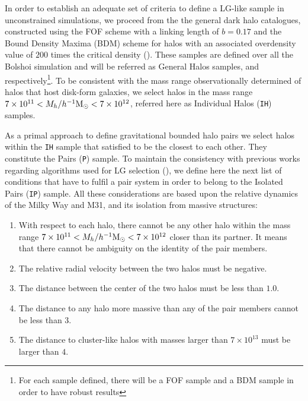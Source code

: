 \documentclass[a4,useAMS,usenatbib,usegraphicx]{latex/mn2e}
\begin{document}
In order to establish an adequate set of criteria to define a LG-like 
sample in unconstrained simulations, we proceed from the the general dark 
halo catalogues, constructed using the FOF scheme with a linking length of 
$b=0.17$ and the Bound Density Maxima (BDM) scheme for halos with an 
associated overdensity value of $200$ times the critical density 
(). These samples are defined over all the Bolshoi 
simulation and will be referred as General Halos samples, \GHFOF and 
\GHBDM respectively\footnote{For each sample defined, there will be a FOF 
sample and a BDM sample in order to have robust results}. To be consistent 
with the mass range observationally determined of halos that host disk-form 
galaxies, we select halos in the mass range $7\times10^{11} < M_{h}/\hMsun 
< 7\times 10^{12}$, referred here as Individual Halos (\texttt{IH}) samples. 



As a primal approach to define gravitational bounded halo pairs we select 
halos within the \texttt{IH} sample that satisfied to be the closest to 
each other. They constitute the Pairs (\texttt{P}) sample. To maintain the 
consistency with previous works regarding algorithms used for LG selection 
(), we define here the next list of conditions 
that have to fulfil a pair system in order to belong to the Isolated Pairs 
(\texttt{IP}) sample. All these considerations are based upon the relative 
dynamics of the Milky Way and M31, and its isolation from massive 
structures:



\begin{enumerate}

\item{With respect to each halo, there cannot be any other halo within the 
mass range $7\times10^{11} < M_{h}/\hMsun < 7\times 10^{12}$ closer than 
its partner. It means that there cannot be ambiguity on the identity of
the pair members.}

\item{The relative radial velocity between the two halos must be 
negative.}

\item{The distance between the center of the two halos must be less than 
$1.0$\hMpc.}

\item{The distance to any halo more massive than any of the pair members 
cannot be less than $3$\hMpc.}

\item{The distance to cluster-like halos with masses larger than 
$7\times10^{13}$ \hMsun must be larger than $4$\hMpc.}
\end{enumerate}
\end{document}
